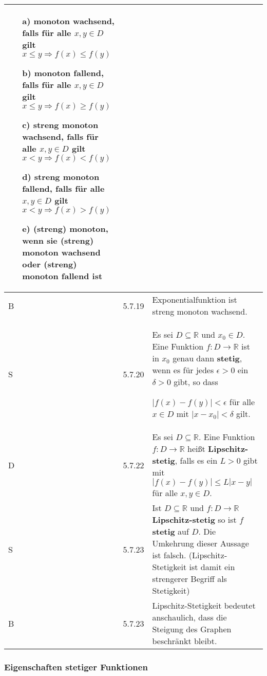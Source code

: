 \begin{longtable}{p{0.75cm} p{1cm} p{16cm}}
\begin{itemize}[topsep=-0.5cm]
                            \item[a)] \textbf{monoton wachsend}, falls für alle $x,y \in D$ gilt $x \leq y \Rightarrow f(x) \leq f(y)$
                            \item[b)] \textbf{monoton fallend}, falls für alle $x,y \in D$ gilt $x \leq y \Rightarrow f(x) \geq f(y)$
                            \item[c)] \textbf{streng monoton wachsend}, falls für alle $x,y \in D$ gilt $x < y \Rightarrow f(x) < f(y)$
                            \item[d)] \textbf{streng monoton fallend}, falls für alle $x,y \in D$ gilt $x < y \Rightarrow f(x) > f(y)$
                            \item[e)] \textbf{(streng) monoton}, wenn sie (streng) monoton wachsend oder (streng) monoton fallend ist 
                        \end{itemize} \vspace{-0cm} \\
        \midrule
        B   & 5.7.19&   Exponentialfunktion ist streng monoton wachsend. \\
        \midrule
        S   & 5.7.20&   Es sei $D \subseteq \mathbb{R}$ und $x_0 \in D$. Eine Funktion $f: D \rightarrow \mathbb{R}$ ist in $x_0$ genau dann
                        \textbf{stetig}, wenn es für jedes $\epsilon > 0$ ein $\delta > 0$ gibt, so dass \hfill \break
                        \centerline{$|f(x) - f(y)| < \epsilon$ für alle $x \in D$ mit $|x-x_0|<\delta$ gilt.} \\
        \midrule
        D   & 5.7.22&   Es sei $D \subseteq \mathbb{R}$. Eine Funktion $f : D \rightarrow \mathbb{R}$ heißt \textbf{Lipschitz-stetig}, falls
                        es ein $L > 0$ gibt mit $|f(x) - f(y)| \leq L|x-y|$ für alle $x,y \in D$. \\
        \midrule
        S   & 5.7.23&   Ist $D \subseteq \mathbb{R}$ und $f:D \rightarrow \mathbb{R}$ \textbf{Lipschitz-stetig} so ist $f$ \textbf{stetig} auf $D$.
                        Die Umkehrung dieser Aussage ist falsch. (Lipschitz-Stetigkeit ist damit ein strengerer Begriff als Stetigkeit) \\
        \midrule
        B   & 5.7.23&   Lipschitz-Stetigkeit bedeutet anschaulich, dass die Steigung des Graphen beschränkt bleibt. \\
        \bottomrule

    \end{longtable}

\subsubsection{Eigenschaften stetiger Funktionen}

